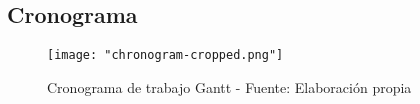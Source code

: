 \subsection{Cronograma}

\begin{figure}[H]
    \centering
    \texttt{[image: "chronogram-cropped.png"]}
    \caption{Cronograma de trabajo Gantt - Fuente: Elaboración propia} \label{fig:chronogram}
\end{figure}
